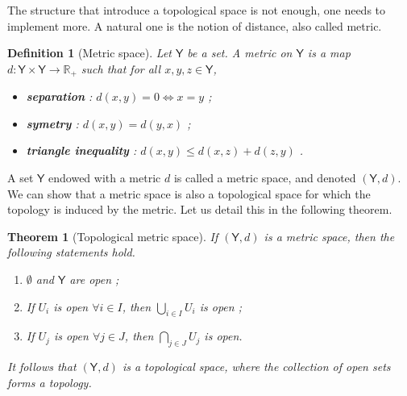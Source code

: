 \documentclass[11pt]{book}
\newcommand{\Rbb}{\mathbb{R}}
\newcommand{\Ysf}{\mathsf{Y}}
\theoremstyle{break}
\newtheorem{theorem}{Theorem}
\newtheorem{definition}{Definition}
\begin{document}
The structure that introduce a topological space is not enough, one needs to implement more. A natural one is the notion of distance, also called metric.


\begin{definition}[Metric space]
Let $\Ysf$ be a set. A metric on $\Ysf$ is a map $d : \Ysf \times \Ysf \to \Rbb_+$ such that for all $x, y, z \in \Ysf$,%
%
\begin{itemize}
\vspace*{-4pt}
\setlength{\itemsep}{-1pt}
\item \textbf{separation} : $d(x,y) = 0 \Leftrightarrow x=y$ ; 
\item \textbf{symetry} : $d(x,y) = d(y,x)$ ;
\item \textbf{triangle inequality} : $d(x,y) \leq d(x,z) + d(z,y)$ .
\end{itemize}
%
\end{definition}


A set $\Ysf$ endowed with a metric $d$ is called a metric space, and denoted $(\Ysf,d)$. We can show that a metric space is also a topological space for which the topology is induced by the metric. Let us detail this in the following theorem.


\begin{theorem}[Topological metric space]
If $(\Ysf,d)$ is a metric space, then the following statements hold.
%
\begin{enumerate}
\vspace*{-4pt}
\setlength{\itemsep}{-1pt}
\item $\emptyset$ and $\Ysf$ are open ; 
\item If $U_i$ is open $\forall i \in I$, then $\bigcup_{i\in I} U_i$ is open ;
\item If $U_j$ is open $\forall j \in J$, then $\bigcap_{j\in J} U_j$ is open.
\end{enumerate}
%
It follows that $(\Ysf,d)$ is a topological space, where the collection of open sets forms a topology.
%
\end{theorem}
\end{document}
